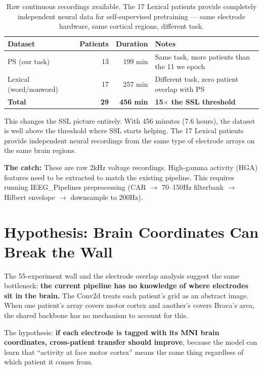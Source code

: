 \documentclass[11pt]{article}
\begin{document}
\begin{table}[ht]
\centering
\begin{tabular}{lrrl}
\toprule
Dataset & Patients & Duration & Notes \\
\midrule
PS (our task) & 13 & 199 min & Same task, more patients than the 11 we epoch \\
Lexical (word/nonword) & 17 & 257 min & Different task, zero patient overlap with PS \\
\midrule
\textbf{Total} & \textbf{29} & \textbf{456 min} & \textbf{15$\times$ the SSL threshold} \\
\bottomrule
\end{tabular}
\caption{Raw continuous recordings available. The 17 Lexical patients provide completely independent neural data for self-supervised pretraining --- same electrode hardware, same cortical regions, different task.}
\label{tab:continuous}
\end{table}

This changes the SSL picture entirely. With 456 minutes (7.6 hours), the dataset is well above the threshold where SSL starts helping. The 17 Lexical patients provide independent neural recordings from the same type of electrode arrays on the same brain regions.

\textbf{The catch:} These are raw 2kHz voltage recordings. High-gamma activity (HGA) features need to be extracted to match the existing pipeline. This requires running IEEG\_Pipelines preprocessing (CAR $\to$ 70--150Hz filterbank $\to$ Hilbert envelope $\to$ downsample to 200Hz).

\section{Hypothesis: Brain Coordinates Can Break the Wall}

The 55-experiment wall and the electrode overlap analysis suggest the same bottleneck: \textbf{the current pipeline has no knowledge of where electrodes sit in the brain.} The Conv2d treats each patient's grid as an abstract image. When one patient's array covers motor cortex and another's covers Broca's area, the shared backbone has no mechanism to account for this.

The hypothesis: \textbf{if each electrode is tagged with its MNI brain coordinates, cross-patient transfer should improve}, because the model can learn that ``activity at face motor cortex'' means the same thing regardless of which patient it comes from.
\end{document}

